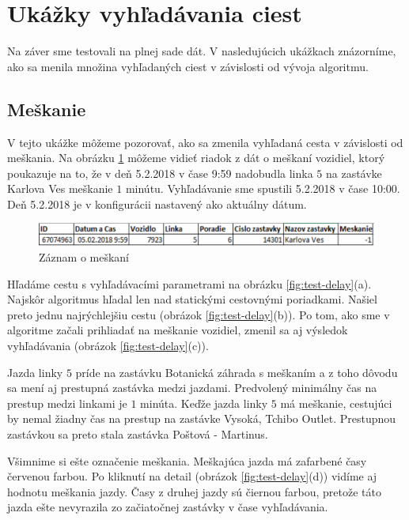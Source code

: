 \section{Ukážky vyhľadávania ciest}
Na záver sme testovali na plnej sade dát. V nasledujúcich ukážkach znázorníme, ako sa menila množina vyhľadaných ciest v závislosti od vývoja algoritmu.

\subsection{Meškanie}
V tejto ukážke môžeme pozorovať, ako sa zmenila vyhľadaná cesta v závislosti od meškania. Na obrázku \ref{fig:delay-row} môžeme vidieť riadok z dát o meškaní vozidiel, ktorý poukazuje na to, že v deň 5.2.2018 v čase 9:59 nadobudla linka $5$ na zastávke Karlova Ves meškanie $1$ minútu. Vyhľadávanie sme spustili 5.2.2018 v čase 10:00. Deň 5.2.2018 je v konfigurácii nastavený ako aktuálny dátum. 

\begin{figure}[H]
\centerline{\includegraphics[width=1.0\textwidth]{images/delay-row}}
\caption[Záznam o meškaní]{Záznam o meškaní}
\label{fig:delay-row}
\end{figure}

Hľadáme cestu s vyhľadávacími parametrami na obrázku \ref{fig:test-delay}(a). Najskôr algoritmus hľadal len nad statickými cestovnými poriadkami. Našiel preto jednu najrýchlejšiu cestu (obrázok \ref{fig:test-delay}(b)). 
Po tom, ako sme v algoritme začali prihliadať na meškanie vozidiel, zmenil sa aj výsledok vyhľadávania (obrázok \ref{fig:test-delay}(c)). 

Jazda linky $5$ príde na zastávku Botanická záhrada s meškaním a z toho dôvodu sa mení aj prestupná zastávka medzi jazdami. Predvolený minimálny čas na prestup medzi linkami je $1$ minúta. Keďže jazda linky $5$ má meškanie, cestujúci by nemal žiadny čas na prestup na zastávke Vysoká, Tchibo Outlet. Prestupnou zastávkou sa preto stala zastávka Poštová - Martinus.

Všimnime si ešte označenie meškania. Meškajúca jazda má zafarbené časy červenou farbou. Po kliknutí na detail (obrázok \ref{fig:test-delay}(d)) vidíme aj hodnotu meškania jazdy. Časy z druhej jazdy sú čiernou farbou, pretože táto jazda ešte nevyrazila zo začiatočnej zastávky v čase vyhľadávania. 

